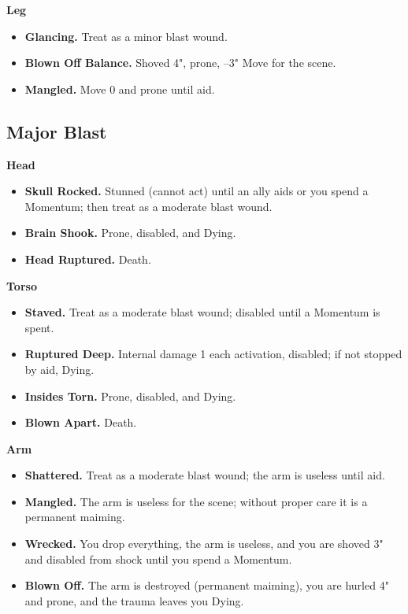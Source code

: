 \textbf{Leg}
\begin{itemize}
    \item[1] \textbf{Glancing.} Treat as a minor blast wound.
    \item[2] \textbf{Blown Off Balance.} Shoved 4", prone, --3" Move for the scene.
    \item[3--4] \textbf{Mangled.} Move 0 and prone until aid.
\end{itemize}

\subsection{Major Blast}

\textbf{Head}
\begin{itemize}
    \item[1] \textbf{Skull Rocked.} Stunned (cannot act) until an ally aids or you spend a Momentum; then treat as a moderate blast wound.
    \item[2] \textbf{Brain Shook.} Prone, disabled, and Dying.
    \item[3--4] \textbf{Head Ruptured.} Death.
\end{itemize}

\textbf{Torso}
\begin{itemize}
    \item[1] \textbf{Staved.} Treat as a moderate blast wound; disabled until a Momentum is spent.
    \item[2] \textbf{Ruptured Deep.} Internal damage 1 each activation, disabled; if not stopped by aid, Dying.
    \item[3] \textbf{Insides Torn.} Prone, disabled, and Dying.
    \item[4] \textbf{Blown Apart.} Death.
\end{itemize}

\textbf{Arm}
\begin{itemize}
    \item[1] \textbf{Shattered.} Treat as a moderate blast wound; the arm is useless until aid.
    \item[2] \textbf{Mangled.} The arm is useless for the scene; without proper care it is a permanent maiming.
    \item[3] \textbf{Wrecked.} You drop everything, the arm is useless, and you are shoved 3" and disabled from shock until you spend a Momentum.
    \item[4] \textbf{Blown Off.} The arm is destroyed (permanent maiming), you are hurled 4" and prone, and the trauma leaves you Dying.
\end{itemize}

